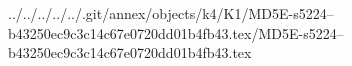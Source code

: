 ../../../../../.git/annex/objects/k4/K1/MD5E-s5224--b43250ec9c3c14c67e0720dd01b4fb43.tex/MD5E-s5224--b43250ec9c3c14c67e0720dd01b4fb43.tex